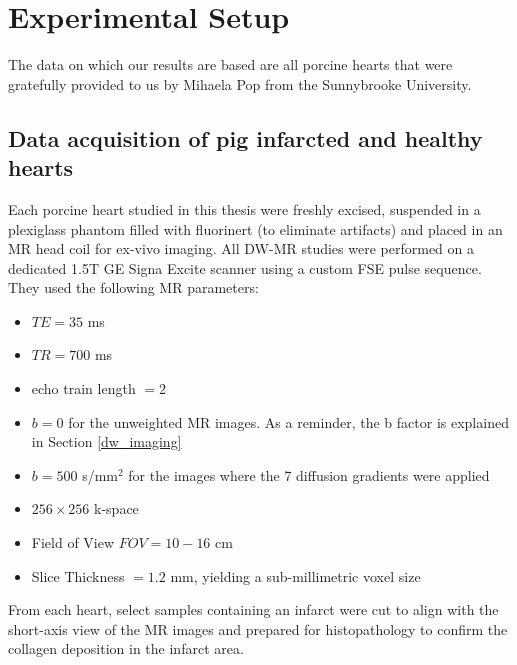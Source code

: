 
\chapter{Experimental Setup}

The data on which our results are based are all porcine hearts that were gratefully provided to us by Mihaela Pop from the Sunnybrooke University.

\section{Data acquisition of pig infarcted and healthy hearts}

Each porcine heart studied in this thesis were freshly excised, suspended in a plexiglass phantom filled with fluorinert (to eliminate artifacts) and placed in an MR head coil for ex-vivo imaging. All DW-MR studies were performed on a dedicated 1.5T GE Signa Excite scanner using a custom FSE pulse sequence. They used the following MR parameters: 
\begin{itemize}
    \item $TE = 35$ ms
    \item $TR = 700$ ms
    \item echo train length $=2$
    \item $b = 0$ for the unweighted MR images. As a reminder, the b factor is explained in Section \ref{dw_imaging}
    \item $b = 500 $ s/$\text{mm}^2$ for the images where the 7 diffusion gradients were applied
    \item $256 \times 256$ k-space
    \item Field of View $FOV = 10-16$ cm
    \item Slice Thickness $ = 1.2$ mm, yielding a sub-millimetric voxel size
\end{itemize}
From each heart, select samples containing an infarct were cut to align with the short-axis view of the MR images and prepared for histopathology to confirm the collagen deposition in the infarct area.

